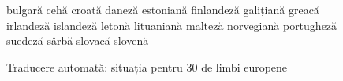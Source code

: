 \begin{figure}[tb]
\begin{tabular}
bulgară \newline 
cehă \newline
croată \newline 
daneză \newline 
estoniană \newline 
finlandeză \newline 
galițiană \newline 
greacă \newline 
irlandeză \newline 
islandeză \newline 
letonă \newline 
lituaniană \newline 
malteză \newline 
norvegiană \newline 
portugheză \newline 
suedeză \newline 
sârbă \newline 
slovacă \newline 
slovenă \newline 
\end{tabular}
\caption{Traducere automată: situația pentru 30 de limbi europene}
\label{fig:mt_cluster_de}
\end{figure}

